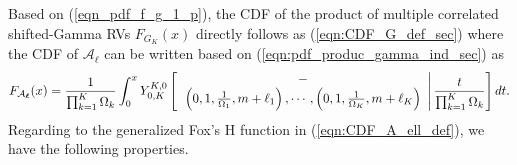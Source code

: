 \documentclass[12pt,onecolumn,draftcls]{IEEEtran}
\newcommand{\bs}{\boldsymbol}
\begin{document}
Based on (\ref{eqn_pdf_f_g_1_p}), the CDF of the product of multiple correlated shifted-Gamma RVs ${F_{ G_K}}\left( x \right)$ directly follows as (\ref{eqn:CDF_G_def_sec}) where the CDF of $\mathcal A_{\bs \ell}$ can be written based on (\ref{eqn:pdf_produc_gamma_ind_sec}) as
\begin{equation}\label{eqn:CDF_A_ell_def}
{F_{{{\cal A}_{\bs \ell} }}}(x) %
 = \frac{1}{{\prod\nolimits_{k = 1}^K {{\Omega _k}} }}\int_0^x {Y_{0,K}^{K,0}\left[ {\left. {\begin{array}{*{20}{c}}
 - \\
{\left( {0,1,\frac{1}{{{\Omega _1}}},m + {\ell _1}} \right), \cdots ,\left( {0,1,\frac{1}{{{\Omega _K}}},m + {\ell _K}} \right)}
\end{array}} \right|\frac{t}{{\prod\nolimits_{k = 1}^K {{\Omega _k}} }}} \right]dt} .
\end{equation}
Regarding to the generalized Fox's H function in (\ref{eqn:CDF_A_ell_def}), we have the following properties.
\end{document}
